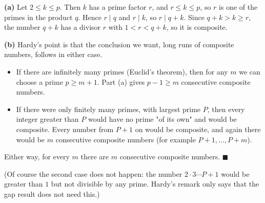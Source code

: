 \textbf{(a)} Let $2\le k\le p$. Then $k$ has a prime factor $r$, and $r\le k\le p$, so $r$ is one of the primes in the product $q$. Hence $r\mid q$ and $r\mid k$, so $r\mid q+k$. Since $q+k>k\ge r$, the number $q+k$ has a divisor $r$ with $1<r<q+k$, so it is composite.

\textbf{(b)} Hardy's point is that the conclusion we want, long runs of composite numbers, follows in either case.
\begin{itemize}
\item If there are infinitely many primes (Euclid's theorem), then for any $m$ we can choose a prime $p\ge m+1$. Part (a) gives $p-1\ge m$ consecutive composite numbers.
\item If there were only finitely many primes, with largest prime $P$, then every integer greater than $P$ would have no prime "of its own" and would be composite. Every number from $P+1$ on would be composite, and again there would be $m$ consecutive composite numbers (for example $P+1,\dots,P+m$).
\end{itemize}
Either way, for every $m$ there are $m$ consecutive composite numbers. $\blacksquare$

(Of course the second case does not happen: the number $2\cdot3\cdots P+1$ would be greater than $1$ but not divisible by any prime. Hardy's remark only says that the gap result does not need this.)
